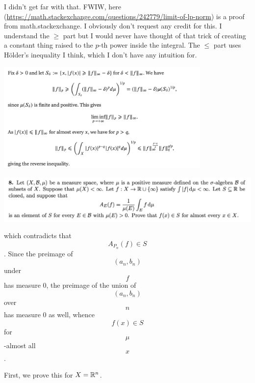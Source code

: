 I didn't get far with that. FWIW, here (\url{https://math.stackexchange.com/questions/242779/limit-of-lp-norm}) is a proof from
math.stackexchange. I obviously don't request any credit for this. I understand the $\geq$ part but
I would never have thought of that trick of creating a constant thing raised to the $p$-th power
inside the integral. The $\leq$ part uses Hölder's inequality I think, which I don't have any
intuition for.
\begin{mdframed}
\includegraphics[width=300pt]{img/analysis--berkeley-202a-final-1b8f.png}
\end{mdframed}


\newpage
\begin{mdframed}
  \includegraphics[width=400pt]{img/analysis--berkeley-202a-final-8aed.png}
\end{mdframed}





which contradicts that $$A_{P_n}(f) \in S$$. Since the preimage of $$(a_n, b_n)$$ under $$f$$ has measure 0, the preimage of the union of $$(a_n, b_n)$$ over $$n$$ has measure 0 as well, whence $$f(x) \in S$$ for $$\mu$$-almost all $$x$$.


First, we prove this for $X = \mathbb{R}^n$.

